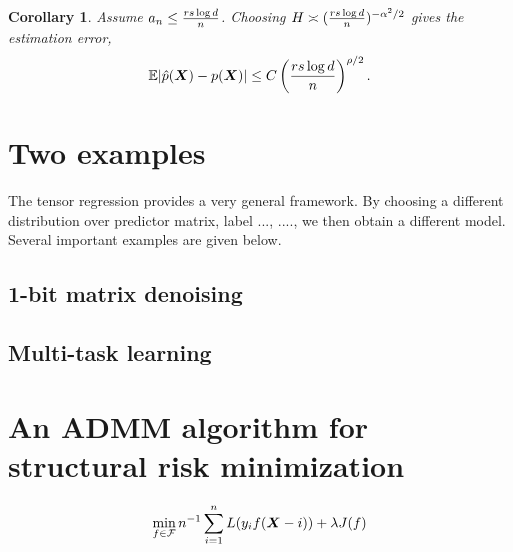 \documentclass[mathptm]{statsoc}
\newtheorem{cor}{Corollary}[section]
\begin{document}
\begin{cor} Assume $a_n \leq {rs\log d \over n}$. Choosing $H\asymp ({rs\log d \over n})^{-\alpha^2/2}$ gives the estimation error,
\[
\mathbb{E}|\hat p(\bm X)- p(\bm X)| \leq C\left({rs\log d \over n}\right)^{\rho/2}.
\]
\end{cor}

\section{Two examples}
The tensor regression provides a very general framework. By choosing a different distribution over predictor matrix, label ..., ...., we then obtain a different model. Several important examples are given below.
\subsection{1-bit matrix denoising}

\subsection{Multi-task learning}

\section{An ADMM algorithm for structural risk minimization}
\[
\min_{f\in \mathcal{F}}n^{-1}\sum_{i=1}^nL(y_if(\bm X-i))+\lambda J(f)
\]
\end{document}
